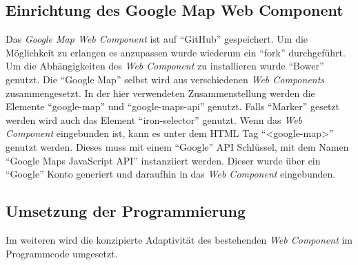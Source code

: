 \documentclass[12pt, paper=a4, bibtotoc, toc=listof, headsepline=true]{scrreprt}
\begin{document}
	\subsection{Einrichtung des Google Map Web Component}
	Das \emph{Google Map Web Component} ist auf \enquote{GitHub} gespeichert. Um die Möglichkeit zu erlangen es anzupassen wurde wiederum ein \enquote{fork} durchgeführt. Um die Abhängigkeiten des \emph{Web Component} zu installieren wurde \enquote{Bower} genutzt. Die \enquote{Google Map} selbst wird aus verschiedenen \emph{Web Components} zusammengesetzt. In der hier verwendeten Zusammenstellung werden die Elemente \enquote{google-map} und \enquote{google-maps-api} genutzt. Falls \enquote{Marker} gesetzt werden wird  auch das Element \enquote{iron-selector} genutzt. Wenn das \emph{Web Component} eingebunden ist, kann es unter dem \ac{HTML} Tag \enquote{<google-map>} genutzt werden. Dieses muss mit einem \enquote{Google} \ac{API} Schlüssel, mit dem Namen \enquote{Google Maps JavaScript API} instanziiert werden. Dieser wurde über ein \enquote{Google} Konto generiert und daraufhin in das \emph{Web Component} eingebunden. 
	\subsection{Umsetzung der Programmierung}
	Im weiteren wird die konzipierte Adaptivität des bestehenden \emph{Web Component} im Programmcode umgesetzt.
\end{document}
